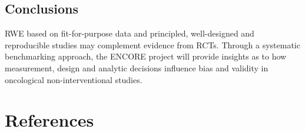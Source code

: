 \documentclass[
  letterpaper,
  DIV=11,
  numbers=noendperiod]{scrartcl}
\begin{document}
\subsection{Conclusions}\label{conclusions}

RWE based on fit-for-purpose data and principled, well-designed and
reproducible studies may complement evidence from RCTs. Through a
systematic benchmarking approach, the ENCORE project will provide
insights as to how measurement, design and analytic decisions influence
bias and validity in oncological non-interventional studies.

\newpage{}

\section*{References}\label{references}
\end{document}
